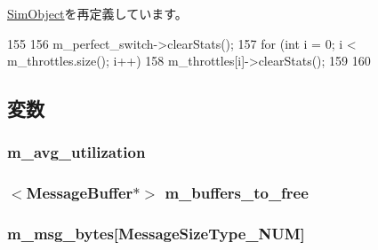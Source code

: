 \hyperlink{classSimObject_a65880e61108132689a1bd769b9187fb7}{SimObject}を再定義しています。


\begin{DoxyCode}
155 {
156     m_perfect_switch->clearStats();
157     for (int i = 0; i < m_throttles.size(); i++) {
158         m_throttles[i]->clearStats();
159     }
160 }
\end{DoxyCode}


\subsection{変数}
\hypertarget{classSwitch_a7e9e107598908b59fea0fa4cd82ab84c}{
\subsubsection[{m\_\-avg\_\-utilization}]{ {\bf m\_\-avg\_\-utilization}}}
\label{classSwitch_a7e9e107598908b59fea0fa4cd82ab84c}
\hypertarget{classSwitch_aeb4204d50ceb840342cc89cd607e8fa9}{
\subsubsection[{m\_\-buffers\_\-to\_\-free}]{$<${\bf MessageBuffer}$\ast$$>$ {\bf m\_\-buffers\_\-to\_\-free}}}
\label{classSwitch_aeb4204d50ceb840342cc89cd607e8fa9}
\hypertarget{classSwitch_a88ad01e3ba9f7c20e95be6554a9badd6}{
\subsubsection[{m\_\-msg\_\-bytes}]{ {\bf m\_\-msg\_\-bytes}\mbox{[}MessageSizeType\_\-NUM\mbox{]}}}
\label{classSwitch_a88ad01e3ba9f7c20e95be6554a9badd6}
